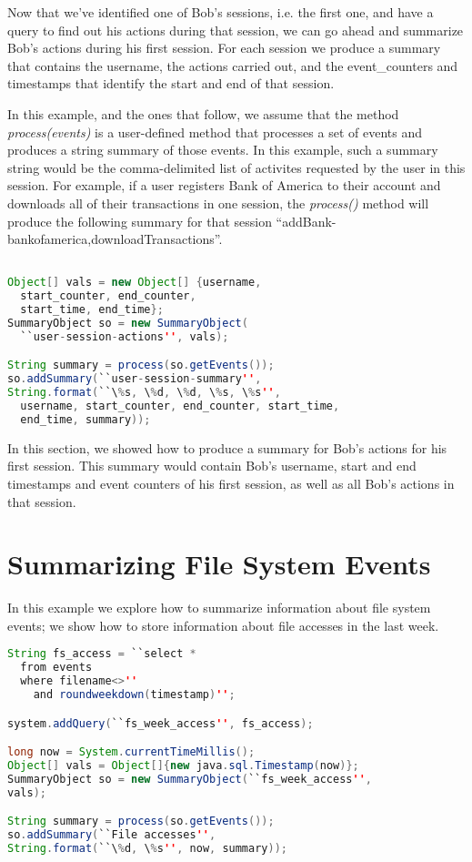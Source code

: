 Now that we've identified one of Bob's sessions, i.e. the first one, and have a query to find out his actions during that session, we can go ahead and summarize Bob's actions during his first session. For each session we produce a summary that contains the username, the actions carried out, and the event\_counters and timestamps that identify the start and end of that session.

In this example, and the ones that follow, we assume that the method \emph{process(events)} is a user-defined method that  processes a set of events and produces a string summary of those events. In this example, such a summary string would be the comma-delimited list of activites requested by the user in this session. For example, if a user registers Bank of America to their account and downloads all of their transactions in one session, the \emph{process()} method will produce the following summary for that session ``addBank-bankofamerica,downloadTransactions''.

\begin{lstlisting}[language=Java]

Object[] vals = new Object[] {username, 
  start_counter, end_counter, 
  start_time, end_time};
SummaryObject so = new SummaryObject(
  ``user-session-actions'', vals);

String summary = process(so.getEvents());
so.addSummary(``user-session-summary'', 
String.format(``\%s, \%d, \%d, \%s, \%s'', 
  username, start_counter, end_counter, start_time, 
  end_time, summary));

\end{lstlisting}

\noindent
In this section, we showed how to produce a summary for Bob's actions for his first session. This summary would contain Bob's username, start and end timestamps and event counters of his first session, as well as all Bob's actions in that session.

\section{Summarizing File System Events}
\label{sum:fs}
In this example we explore how to summarize information about file system events; we show how to store information about file accesses in the last week.

\begin{lstlisting}[language=Java]
String fs_access = ``select * 
  from events 
  where filename<>'' 
    and roundweekdown(timestamp)'';

system.addQuery(``fs_week_access'', fs_access);

long now = System.currentTimeMillis();
Object[] vals = Object[]{new java.sql.Timestamp(now)};
SummaryObject so = new SummaryObject(``fs_week_access'', 
vals);

String summary = process(so.getEvents());
so.addSummary(``File accesses'', 
String.format(``\%d, \%s'', now, summary));
\end{lstlisting}

